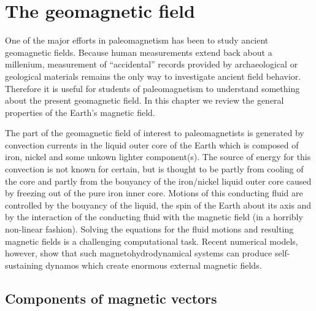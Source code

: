 \chapter{The geomagnetic field}



One of the major efforts in paleomagnetism has been to study
ancient geomagnetic fields. Because human measurements extend back about a millenium, measurement of ``accidental'' records provided by  archaeological or geological materials remains the only way to investigate ancient field behavior.  Therefore it is useful for students of paleomagnetism to understand something about the present geomagnetic field.  In this chapter we review the
general properties of the Earth's magnetic field.  

The part of the geomagnetic 
field of interest to paleomagnetists is generated by convection currents in the liquid outer core
of the Earth which is composed of iron, nickel and some unkown lighter
component(s). The source of energy for this convection is not known for certain, but is thought to be partly from cooling of the core and partly from the bouyancy of the iron/nickel liquid outer core caused by freezing out of the pure iron inner core.    Motions of this conducting fluid  are 
controlled by the bouyancy of the liquid, the 
spin of the Earth about its axis and by the interaction of the conducting fluid with the magnetic field (in a horribly non-linear fashion).  Solving the equations for the  fluid motions and resulting magnetic fields is a challenging computational task.   Recent numerical models, however, show that  such magnetohydrodynamical systems can   produce self-sustaining dynamos which  create
enormous external magnetic fields.  



\section {Components of magnetic vectors}
\label{sect:comp}

